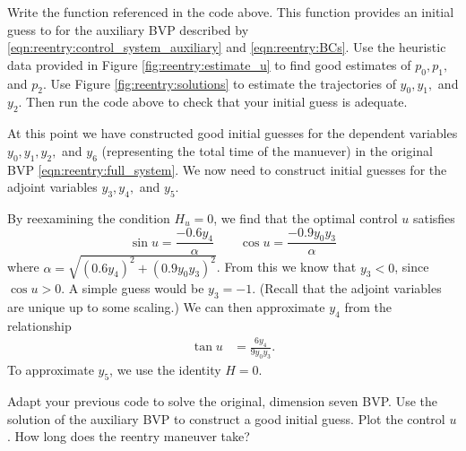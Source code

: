 \begin{problem}
	Write the function  referenced in the code above. 
	This function provides an initial guess to  for the auxiliary BVP described by  \eqref{eqn:reentry:control_system_auxiliary} and \eqref{eqn:reentry:BCs}.
	Use the heuristic data provided in Figure \ref{fig:reentry:estimate_u} to find good estimates of $p_0, p_1,$ and $p_2$. 
	Use Figure \ref{fig:reentry:solutions} to estimate the trajectories of $y_0, y_1,$ and $y_2$.
	Then run the code above to check that your initial guess is adequate. 
	\label{prob:reentry:guess}
\end{problem}

At this point we have constructed good initial guesses for the dependent variables $y_0,y_1, y_2,$ and $y_6$ (representing the total time of the manuever) in the original BVP \eqref{eqn:reentry:full_system}. 
We now need to construct initial guesses for the adjoint variables $y_3, y_4,$ and $y_5$. 

By reexamining the condition $H_u = 0$, we find that the optimal control $u$ satisfies 
\[
\sin u = \frac{-0.6 y_4}{\alpha} \qquad \cos u  = \frac{-0.9 y_0y_3}{\alpha}
\]
where $\alpha = \sqrt{(0.6y_4)^2 + (0.9y_0y_3)^2}$.
From this we know that $y_3 <0$, since $\cos u >0$. A simple guess would be $y_3 = -1$. 
(Recall that the adjoint variables are unique up to some scaling.) 
We can then approximate $y_4$ from the relationship 
\begin{align*}
\tan u &= \frac{6y_4}{9y_0y_3}.
\end{align*}
To approximate $y_5$, we use the identity $H = 0$.


\begin{problem}
	Adapt your previous code to solve the original, dimension seven BVP. 
	Use the solution of the auxiliary BVP to construct a good initial guess.
	Plot the control $u$. How long does the reentry maneuver take? 
\end{problem}

